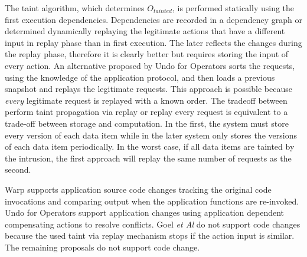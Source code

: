 The taint algorithm, which determines $O_{tainted}$, is performed statically using the first execution dependencies. Dependencies are recorded in a dependency graph or determined dynamically replaying the legitimate actions that have a different input in replay phase than in first execution. The later reflects the changes during the replay phase, therefore it is clearly better but requires storing the input of every action. An alternative proposed by Undo for Operators \cite{undoForOperators} sorts the requests, using the knowledge of the application protocol, and then loads a previous snapshot and replays the legitimate requests. This approach is possible because \textit{every} legitimate request is replayed with a known order. The tradeoff between perform taint propagation via replay or replay every request is equivalent to a trade-off between storage and computation. In the first, the system must store every version of each data item while in the later system only stores the versions of each data item periodically. In the worst case, if all data items are tainted by the intrusion, the first approach will replay the same number of requests as the second. 

Warp \cite{warp} supports application source code changes tracking the original code invocations and comparing output when the application functions are re-invoked. Undo for Operators \cite{undoForOperators} support application changes using application dependent compensating actions to resolve conflicts. Goel \textit{et Al} \cite{goel} do not support code changes because the used taint via replay mechanism stops if the action input is similar. The remaining proposals do not support code change. 

